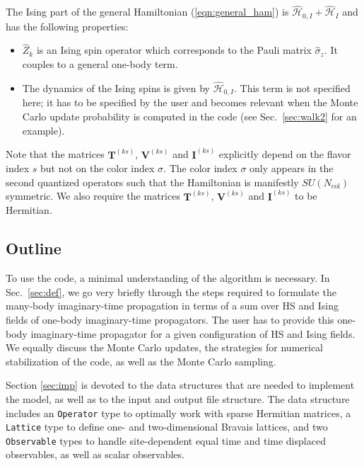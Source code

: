 The Ising part of the general Hamiltonian (\ref{eqn:general_ham}) is $\hat{\mathcal{H}}_{0,I}+ \hat{\mathcal{H}}_{I}$ and  has the following properties:
\begin{itemize}
\item $\hat{Z}_k$ is an Ising spin operator which corresponds to the Pauli matrix $\hat{\sigma}_{z}$. It couples to a general one-body term. 
\item  The dynamics of the Ising spins is given by $\hat{\mathcal{H}}_{0,I}$. This term is not specified here; 
it has to be specified by the user and becomes relevant when the Monte Carlo update probability is computed in the code (see Sec.~\ref{sec:walk2} for an example).
\end{itemize}
Note that the matrices  $\bm{T}^{(ks)}$,  $\bm{V}^{(ks)}$ and  $\bm{I}^{(ks)}$ explicitly depend on the flavor index $s$ but not on the color index $\sigma$. 
The color index $\sigma$ only appears in  the  second quantized operators such that the Hamiltonian is manifestly $SU(N_{\mathrm{col}})$    symmetric.  We also require
the matrices $\bm{T}^{(ks)}$,  $\bm{V}^{(ks)}$ and  $\bm{I}^{(ks)}$  to be  Hermitian.

\subsection{Outline}

To use the code, a minimal understanding of the algorithm is necessary. 
In Sec.~\ref{sec:def}, we go very briefly through  the steps required  to formulate the many-body imaginary-time propagation in terms of a sum  over HS and Ising fields  of one-body  imaginary-time propagators.   
The user has to provide this one-body imaginary-time propagator for a given configuration of   HS and  Ising fields. 
We equally discuss the Monte Carlo updates, the strategies for numerical stabilization of the code, as well as the Monte Carlo sampling.

Section \ref{sec:imp} is devoted to the data structures that are needed to implement the model, as well as to the input and output file structure.   
The data structure includes  an \texttt{Operator} type to  optimally work with sparse Hermitian matrices, a \texttt{Lattice} type  to define one- and two-dimensional Bravais lattices, and   two   \texttt{Observable} types to handle site-dependent equal time and  time displaced observables, as well as scalar observables. 

